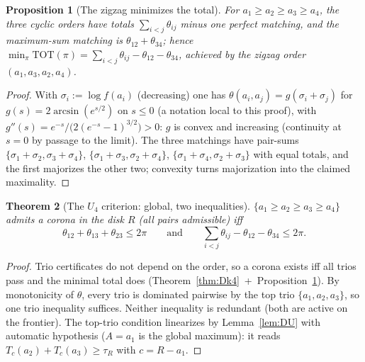 \documentclass[11pt]{article}
\newtheorem{theorem}{Theorem}
\newtheorem{proposition}[theorem]{Proposition}
\theoremstyle{definition}
\begin{document}
\begin{proposition}[The zigzag minimizes the total]\label{prop:Dzigzag}
For $a_1\ge a_2\ge a_3\ge a_4$, the three cyclic orders have totals
$\sum_{i<j}\theta_{ij}$ minus one perfect matching, and the maximum-sum
matching is $\theta_{12}+\theta_{34}$; hence
$\min_\pi\mathrm{TOT}(\pi)=\sum_{i<j}\theta_{ij}-\theta_{12}-\theta_{34}$,
achieved by the zigzag order $(a_1,a_3,a_2,a_4)$.
\end{proposition}
\begin{proof}
With $\sigma_i:=\log f(a_i)$ (decreasing) one has
$\theta(a_i,a_j)=g(\sigma_i+\sigma_j)$ for $g(s)=2\arcsin(e^{s/2})$ on
$s\le0$ (a notation local to this proof), with
$g''(s)=e^{-s}/\bigl(2(e^{-s}-1)^{3/2}\bigr)>0$: $g$ is convex and
increasing (continuity at $s=0$ by passage to the limit). The three
matchings have pair-sums $\{\sigma_1+\sigma_2,\sigma_3+\sigma_4\}$,
$\{\sigma_1+\sigma_3,\sigma_2+\sigma_4\}$,
$\{\sigma_1+\sigma_4,\sigma_2+\sigma_3\}$ with equal totals, and the first
majorizes the other two; convexity turns majorization into the claimed
maximality.
\end{proof}

\begin{theorem}[The $U_4$ criterion: global, two inequalities]
\label{thm:DU4}
$\{a_1\ge a_2\ge a_3\ge a_4\}$ admits a corona in the disk $R$ (all pairs
admissible) iff
\[
\theta_{12}+\theta_{13}+\theta_{23}\le2\pi
\qquad\text{and}\qquad
\sum_{i<j}\theta_{ij}-\theta_{12}-\theta_{34}\le2\pi .
\]
\end{theorem}
\begin{proof}
Trio certificates do not depend on the order, so a corona exists iff all
trios pass and the minimal total does
(Theorem~\ref{thm:Dk4}~+~Proposition~\ref{prop:Dzigzag}). By monotonicity
of $\theta$, every trio is dominated pairwise by the top trio
$\{a_1,a_2,a_3\}$, so one trio inequality suffices. Neither inequality is
redundant (both are active on the frontier). The top-trio condition
linearizes by Lemma~\ref{lem:DU} with automatic hypothesis
($A=a_1$ is the global maximum): it reads
$T_c(a_2)+T_c(a_3)\ge\tau_R$ with $c=R-a_1$.
\end{proof}
\end{document}
